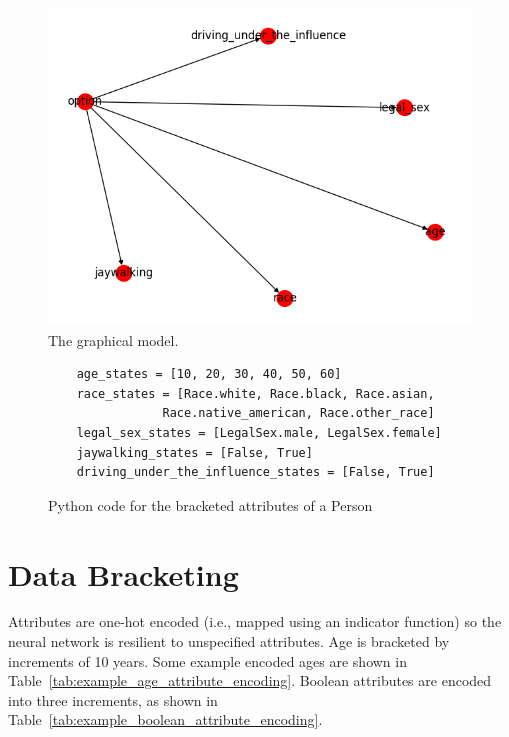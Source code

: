\documentclass[]{report}
\begin{document}
\begin{figure}[h]
    \centering
    \includegraphics[scale=0.6]{figures/network.png}
    \caption[]{The graphical model.}
    \label{fig:graphical_model_image}
\end{figure}

\begin{figure}[h]
    \centering
    \begin{verbatim}
    age_states = [10, 20, 30, 40, 50, 60]
    race_states = [Race.white, Race.black, Race.asian,
                Race.native_american, Race.other_race]
    legal_sex_states = [LegalSex.male, LegalSex.female]
    jaywalking_states = [False, True]
    driving_under_the_influence_states = [False, True]
    \end{verbatim}
    \caption{Python code for the bracketed attributes of a Person}
    \label{fig:code_for_person_attribute_domains}
\end{figure}

\FloatBarrier
\section{Data Bracketing}
\label{sec:data-bracketing}

Attributes are one-hot encoded (i.e., mapped using an indicator function) so the neural network is
resilient to unspecified attributes. Age is bracketed by increments of 10 years. Some example
encoded ages are shown in Table~\ref{tab:example_age_attribute_encoding}. Boolean attributes are
encoded into three increments, as shown in Table~\ref{tab:example_boolean_attribute_encoding}.
    
\end{document}
